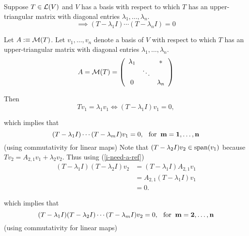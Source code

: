 \begin{thm}
  \label{thm:equation-satisfied-by-operator-with-upper-triangular-matrix}
  Suppose $T\in \mathcal{L}(V)$ and $V$ has a basis with respect to which $T$ has an upper-triangular matrix with diagonal entries $\lambda_1, \dots, \lambda_n$.
  \begin{equation}
    \implies (T-\lambda_1I) \cdots (T-\lambda_nI)=0
  \end{equation}
\end{thm}
\begin{prf}
  Let $A :\equiv \mathcal{M}(T)$. Let $v_1, \ldots, v_n$ denote a basis of $V$ with respect to which $T$  has an upper-triangular matrix with diagonal entries $\lambda_1, \ldots, \lambda_n$.
  \begin{equation}
    A=\mathcal{M}(T) =
    \left( {\begin{array}{ccc}
        \lambda_1 &         &  * \\
        &  \ddots &    \\
        0     &         & \lambda_n
    \end{array} } \right)
  \end{equation}
  
  Then
  \begin{equation}
    \label{i-need-a-ref}
    T v_1 = \lambda_1 v_1 \iff (T-\lambda_1 I)  v_1 = 0,
  \end{equation}
  
  which implies that
  \begin{equation}
    (T-\lambda_1 I) \cdots (T-\lambda_m I) v_1 = 0, \;\;\, \text{for}\;\; \mathbf{m = 1, \ldots, n}
  \end{equation}
  (using commutativity for linear maps)
  \bigbreak
  Note that $(T-\lambda_2 I) v_2 \in \operatorname{span} (v_1)$ because $T v_2 = A_{2,1} v_1 + \lambda_2 v_2$. Thus using (\ref{i-need-a-ref})
  \begin{equation}
    \begin{aligned}
      \label{i-also-need-a-ref}
      (T- \lambda_1 I) (T- \lambda_2 I) v_2 
      &= (T- \lambda_1 I) A_{2,1}v_1  \\
      &= A_{2,1}(T- \lambda_1 I) v_1  \\
      &=0. 
    \end{aligned}
  \end{equation}
  
  which implies that
  \begin{equation}
    (T-\lambda_1 I) (T-\lambda_2 I) \cdots (T-\lambda_m I) v_2 = 0, \;\;\, \text{for}\;\; \mathbf{m = 2, \ldots, n}
  \end{equation}
  (using commutativity for linear maps)
  \bigbreak
  

\end{prf}
